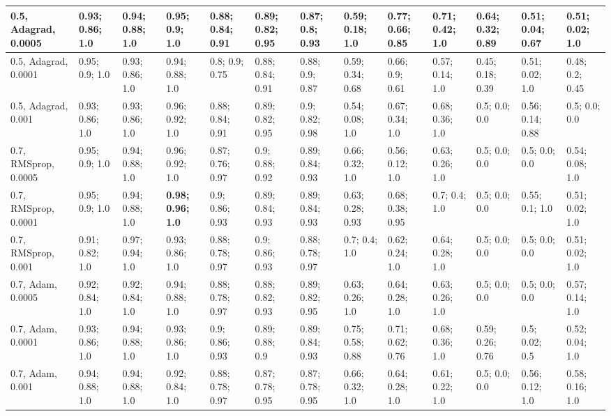 \documentclass{VUMIFPSbakalaurinis}
\begin{document}
\begin{longtable}{ | p{1.5cm} | p{1cm} | p{1cm} | p{1cm} | p{1cm} | p{1cm} | p{1cm} | p{1cm} | p{1cm} | p{1cm} | p{1cm} | p{1cm} | p{1cm} | }
    0.5, Adagrad, 0.0005  & 0.93; 0.86; 1.0 & 0.94; 0.88; 1.0 & 0.95; 0.9; 1.0    &  0.88; 0.84; 0.91 & 0.89; 0.82; 0.95 & 0.87; 0.8; 0.93   &  0.59; 0.18; 1.0 & \textbf{0.77; 0.66; 0.85} & 0.71; 0.42; 1.0   &  \textbf{0.64; 0.32; 0.89} & 0.51; 0.04; 0.67 & 0.51; 0.02; 1.0  \\ \hline
    0.5, Adagrad, 0.0001  & 0.95; 0.9; 1.0 & 0.93; 0.86; 1.0 & 0.94; 0.88; 1.0    &  0.8; 0.9; 0.75 & 0.88; 0.84; 0.91 & 0.88; 0.9; 0.87     &  0.59; 0.34; 0.68 & 0.66; 0.9; 0.61 & 0.57; 0.14; 1.0            &  0.45; 0.18; 0.39 & 0.51; 0.02; 1.0 & 0.48; 0.2; 0.45  \\ \hline
    0.5, Adagrad, 0.001   & 0.93; 0.86; 1.0 & 0.93; 0.86; 1.0 & 0.96; 0.92; 1.0   &  0.88; 0.84; 0.91 & 0.89; 0.82; 0.95 & 0.9; 0.82; 0.98   &  0.54; 0.08; 1.0 & 0.67; 0.34; 1.0 & 0.68; 0.36; 1.0             &  0.5; 0.0; 0.0 & 0.56; 0.14; 0.88 & 0.5; 0.0; 0.0  \\ \hline
    0.7, RMSprop, 0.0005  & 0.95; 0.9; 1.0 & 0.94; 0.88; 1.0 & 0.96; 0.92; 1.0    &  0.87; 0.76; 0.97 & 0.9; 0.88; 0.92 & 0.89; 0.84; 0.93   &  0.66; 0.32; 1.0 & 0.56; 0.12; 1.0 & 0.63; 0.26; 1.0             &  0.5; 0.0; 0.0 & 0.5; 0.0; 0.0 & 0.54; 0.08; 1.0  \\ \hline
    0.7, RMSprop, 0.0001  & 0.95; 0.9; 1.0 & 0.94; 0.88; 1.0 & \textbf{0.98; 0.96; 1.0}    &  0.9; 0.86; 0.93 & 0.89; 0.84; 0.93 & 0.89; 0.84; 0.93   &  0.63; 0.28; 0.93 & 0.68; 0.38; 0.95 & 0.7; 0.4; 1.0             &  0.5; 0.0; 0.0 & 0.55; 0.1; 1.0 & 0.51; 0.02; 1.0  \\ \hline
    0.7, RMSprop, 0.001   & 0.91; 0.82; 1.0 & 0.97; 0.94; 1.0 & 0.93; 0.86; 1.0   &  0.88; 0.78; 0.97 & 0.9; 0.86; 0.93 & 0.88; 0.78; 0.97   &  0.7; 0.4; 1.0 & 0.62; 0.24; 1.0 & 0.64; 0.28; 1.0               &  0.5; 0.0; 0.0 & 0.5; 0.0; 0.0 & 0.51; 0.02; 1.0  \\ \hline
    0.7, Adam, 0.0005     & 0.92; 0.84; 1.0 & 0.92; 0.84; 1.0 & 0.94; 0.88; 1.0   &  0.88; 0.78; 0.97 & 0.88; 0.82; 0.93 & 0.89; 0.82; 0.95  &  0.63; 0.26; 1.0 & 0.64; 0.28; 1.0 & 0.63; 0.26; 1.0             &  0.5; 0.0; 0.0 & 0.5; 0.0; 0.0 & 0.57; 0.14; 1.0  \\ \hline
    0.7, Adam, 0.0001     & 0.93; 0.86; 1.0 & 0.94; 0.88; 1.0 & 0.93; 0.86; 1.0   &  0.9; 0.86; 0.93 & 0.89; 0.88; 0.9 & 0.89; 0.84; 0.93    &  0.75; 0.58; 0.88 & 0.71; 0.62; 0.76 & 0.68; 0.36; 1.0           &  0.59; 0.26; 0.76 & 0.5; 0.02; 0.5 & 0.52; 0.04; 1.0  \\ \hline
    0.7, Adam, 0.001      & 0.94; 0.88; 1.0 & 0.94; 0.88; 1.0 & 0.92; 0.84; 1.0   &  0.88; 0.78; 0.97 & 0.87; 0.78; 0.95 & 0.87; 0.78; 0.95  &  0.66; 0.32; 1.0 & 0.64; 0.28; 1.0 & 0.61; 0.22; 1.0             &  0.5; 0.0; 0.0 & 0.56; 0.12; 1.0 & 0.58; 0.16; 1.0  \\ \hline

\end{longtable}
\end{document}
